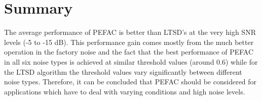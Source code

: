 \clearpage


\section{Summary}

The average performance of PEFAC is better than LTSD's at the very high SNR levels (-5 to -15 dB). This performance gain comes mostly from the much better operation in the factory noise and the fact that the best performance of PEFAC in all six noise types is achieved at similar threshold values (around 0.6) while for the LTSD algorithm the threshold values vary significantly between different noise types. Therefore, it can be concluded that PEFAC should be considered for applications which have to deal with varying conditions and high noise levels.